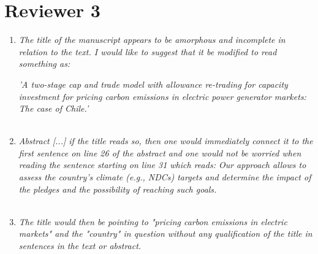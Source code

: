 \documentclass[a4paper]{amsart}
\theoremstyle{plain}
\theoremstyle{definition}
\theoremstyle{remark}
\numberwithin{equation}{section}
\begin{document}

\section*{Reviewer 3}


\begin{enumerate}

\item \emph{The title of the manuscript appears to be amorphous and incomplete in relation to the text. I would like to suggest that it be modified to read something as:}

\emph{'A two-stage cap and trade model with allowance re-trading for capacity investment for pricing carbon emissions in electric power generator markets: The case of Chile.'}\\

{}\\

\item \emph{Abstract [...] if the title reads so, then one would immediately connect it to the first sentence on line 26 of the abstract and one would not be worried when reading the sentence starting on line 31 which reads: Our approach allows to assess the country's climate
(e.g., NDCs) targets and determine the impact of the pledges and the possibility of reaching such
goals.}\\

{\color{blue}{We agreed with the reviewer. We have modified the abstract accordingly to the new title of the manuscript.}}\\


\item \emph{The title would then be pointing to "pricing carbon emissions in electric markets" and the "country" in question without any qualification of the title in sentences in the text or abstract.}\\

{\color{blue}{We thank the reviewer for the suggestions to restructure the title and abstract. We have followed such recommendations.}}\\


\end{enumerate}
\end{document}
